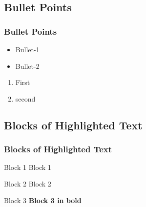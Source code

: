 \documentclass[table,10pt,red]{beamer}	%
\begin{document}

\subsection{Bullet Points} %
\begin{frame}
	\frametitle{Bullet Points }
	\begin{itemize}  %
		\item Bullet-1
		\item Bullet-2
\end{itemize}

\begin{enumerate}[$\checkmark$]
		\item <+-|alert@+> First
		\item <+-|alert@+> second
\end{enumerate}

\end{frame}

\subsection{Blocks of Highlighted Text} %
\begin{frame}
	\frametitle{Blocks of Highlighted Text}
	\begin{block}{Block 1}
		Block 1
	\end{block}

	\begin{block}{Block 2}
		Block 2
	\end{block}

	\begin{block}{Block 3}
		\textbf{Block 3 in bold}
	\end{block}
\end{frame}

\end{document}
